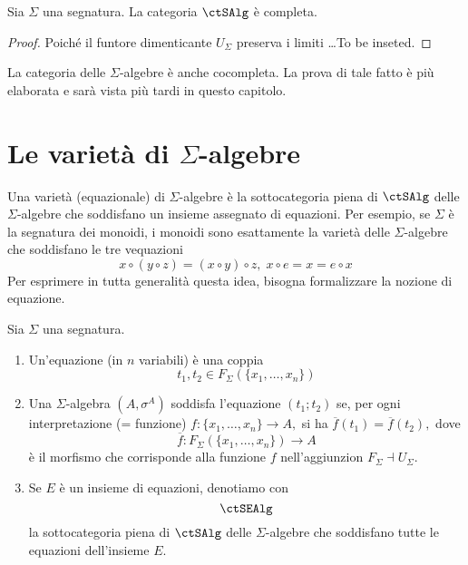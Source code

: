 \begin{proposition}\label{prop_alg_compl}
Sia $\Sigma$ una segnatura. La categoria $\ctSAlg$ è completa.
\end{proposition}

\begin{proof}
Poiché il funtore dimenticante $U_{\Sigma}$ preserva i limiti \ldots To be inseted.
\end{proof} 

La categoria delle $\Sigma$-algebre è anche cocompleta. La prova di tale fatto è più elaborata e sarà vista più tardi in questo capitolo.

\section{Le varietà di $\Sigma$-algebre}\label{sec_var_alg}

Una varietà (equazionale) di $\Sigma$-algebre è la sottocategoria piena di $\ctSAlg$ delle $\Sigma$-algebre che soddisfano un insieme
assegnato di equazioni. Per esempio, se $\Sigma$ è la segnatura dei monoidi, i monoidi sono esattamente la varietà delle $\Sigma$-algebre 
che soddisfano le tre vequazioni 
$$x \circ (y \circ z) = (x \circ y) \circ z, \; x \circ e = x = e \circ x$$
Per esprimere in tutta generalità questa idea, bisogna formalizzare la nozione di equazione.

\begin{definition}\label{def_equaz_alg}
Sia $\Sigma$ una segnatura.
\begin{enumerate}
\item Un'equazione (in $n$ variabili) è una coppia
$$t_1,t_2 \in F_{\Sigma}(\{x_1,\ldots,x_n\})$$
\item Una $\Sigma$-algebra $(A,\sigma^A)$ soddisfa l'equazione $(t_1;t_2)$ se, per ogni interpretazione (= funzione) 
$f \colon \{x_1,\ldots,x_n\} \to A,$
si ha $\overline{f}(t_1) = \overline{f}(t_2),$ dove 
$$\overline{f} \colon F_{\Sigma}(\{x_1,\ldots,x_n\}) \to A$$ 
è il morfismo che corrisponde alla funzione $f$ nell'aggiunzion $F_{\Sigma} \dashv U_{\Sigma}.$
\item Se $E$ è un insieme di equazioni, denotiamo con
$$\ctSEAlg$$
la sottocategoria piena di $\ctSAlg$ delle $\Sigma$-algebre che soddisfano tutte le equazioni dell'insieme $E.$
\end{enumerate}
\end{definition}

